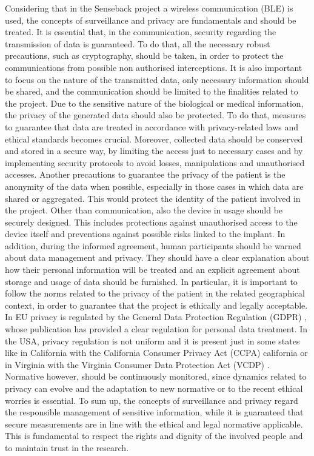 \documentclass{Configuration_Files/PoliMi3i_thesis}
\begin{document}
Considering that in the Senseback project a wireless communication (BLE) is used, the concepts of surveillance and privacy are fundamentals and should be treated.
It is essential that, in the communication, security regarding the transmission of data is guaranteed. To do that, all the necessary robust precautions, such as cryptography, should be taken, in order to protect the communications from possible non authorised interceptions. It is also important to focus on the nature of the transmitted data, only necessary information should be shared, and the communication should be limited to the finalities related to the project.
Due to the sensitive nature of the biological or medical information, the privacy of the generated data should also be protected. To do that, measures to guarantee that data are treated in accordance with privacy-related laws and ethical standards becomes crucial. Moreover, collected data should be conserved and stored in a secure way, by limiting the access just to necessary cases and by implementing security protocols to avoid losses, manipulations and unauthorised accesses.
Another precautions to guarantee the privacy of the patient is the anonymity of the data when possible, especially in those cases in which data are shared or aggregated. This would protect the identity of the patient involved in the project.
Other than communication, also the device in usage should be securely designed. This includes protections against unauthorised access to the device itself and preventions against possible risks linked to the implant.
In addition, during the informed agreement, human participants should be warned about data management and privacy. They should have a clear explanation about how their personal information will be treated and an explicit agreement about storage and usage of data should be furnished. In particular, it is important to follow the norms related to the privacy of the patient in the related geographical context, in order to guarantee that the project is ethically and legally acceptable. In EU privacy is regulated by the General Data Protection Regulation (GDPR) \cite{L_2016119EN01000101Xml}, whose publication has provided a clear regulation for personal data treatment. In the USA, privacy regulation is not uniform and it is present just in some states like in California with the California Consumer Privacy Act (CCPA) \cite{}california or in Virginia with the Virginia Consumer Data Protection Act (VCDP) \cite{CodeVirginiaCode}. Normative however, should be continuously monitored, since dynamics related to privacy can evolve and the adaptation to new normative or to the recent ethical worries is essential.
To sum up, the concepts of surveillance and privacy regard the responsible management of sensitive information, while it is guaranteed that secure measurements are in line with the ethical and legal normative applicable. This is fundamental to respect the rights and dignity of the involved people and to maintain trust in the research. 
\end{document}
